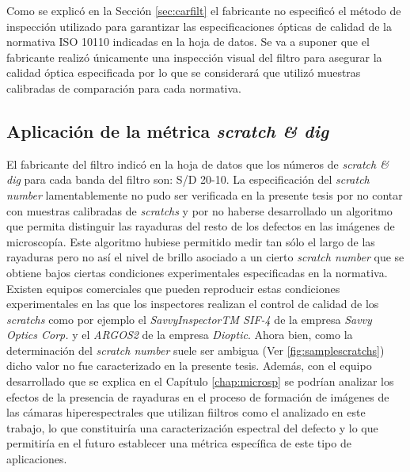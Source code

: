 Como se explicó en la Sección \ref{sec:carfilt} el fabricante no especificó el método de inspección utilizado para garantizar las especificaciones ópticas de calidad de la normativa ISO 10110 indicadas en la hoja de datos. Se va a suponer que el fabricante realizó únicamente una inspección visual del filtro para asegurar la calidad óptica especificada por lo que se considerará que utilizó muestras calibradas de comparación para cada normativa.

\singlespacing
\subsection{Aplicación de la métrica \textit{scratch \& dig}}
\label{sec:sctdig}

\hspace{0.5cm}El fabricante del filtro indicó en la hoja de datos que los números de \textit{scratch \& dig} para cada banda del filtro son: S/D 20-10. La especificación del \textit{scratch number} lamentablemente no pudo ser verificada en la presente tesis por no contar con muestras calibradas de \textit{scratchs} y por no haberse desarrollado un algoritmo que permita distinguir las rayaduras del resto de los defectos en las imágenes de microscopía. Este algoritmo hubiese permitido medir tan sólo el largo de las rayaduras pero no así el nivel de brillo asociado a un cierto \textit{scratch number} que se obtiene bajos ciertas condiciones experimentales especificadas en la normativa. Existen equipos comerciales que pueden reproducir estas condiciones experimentales en las que los inspectores realizan el control de calidad de los \textit{scratchs} como por ejemplo el \textit{SavvyInspectorTM SIF-4} de la empresa \textit{Savvy Optics Corp.} y el \textit{ARGOS2} de la empresa \textit{Dioptic}. Ahora bien, como la determinación del \textit{scratch number} suele ser ambigua (Ver \ref{fig:samplescratchs}) dicho valor no fue caracterizado en la presente tesis. Además, con el equipo desarrollado que se explica en el Capítulo \ref{chap:microsp} se podrían analizar los efectos de la presencia de rayaduras en el proceso de formación de imágenes de las cámaras hiperespectrales que utilizan fiiltros como el analizado en este trabajo, lo que constituiría una caracterización espectral del defecto y lo que permitiría en el futuro establecer una métrica específica de este tipo de aplicaciones.



